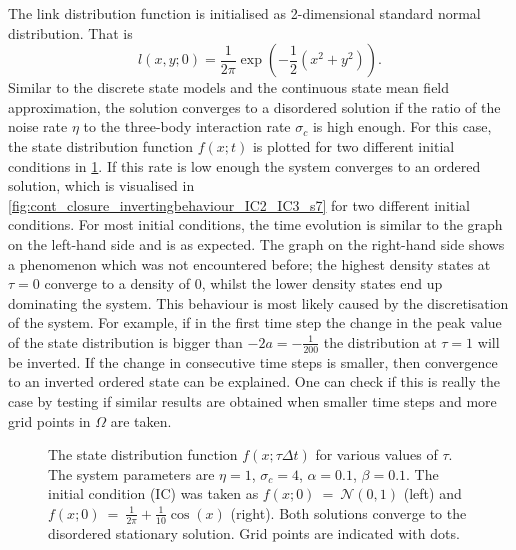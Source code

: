 The link distribution function is initialised as 2-dimensional standard normal distribution. That is 
\begin{equation}\label{eq:IC_link}
	l(x,y;0)=\frac{1}{2\pi} \exp\left(-\frac{1}{2} \left(x^2+y^2\right) \right).
\end{equation} 
Similar to the discrete state models and the continuous state mean field approximation, the solution converges to a disordered solution if the ratio of the noise rate $\eta$ to the three-body interaction rate $\sigma_c$ is high enough. For this case, the state distribution function $f(x;t)$ is plotted for two different initial conditions in \cref{fig:cont_closure_state_t_disordered_IC1_IC6_s4}. If this rate is low enough the system converges to an ordered solution, which is visualised in \cref{fig:cont_closure_invertingbehaviour_IC2_IC3_s7} for two different initial conditions. For most initial conditions, the time evolution is similar to the graph on the left-hand side and is as expected. The graph on the right-hand side shows a phenomenon which was not encountered before; the highest density states at $\tau=0$ converge to a density of 0, whilst the lower density states end up dominating the system. This behaviour is most likely caused by the discretisation of the system. For example, if in the first time step the change in the peak value of the state distribution is bigger than $-2a=-\frac{1}{200}$ the distribution at $\tau=1$ will be inverted. If the change in consecutive time steps is smaller, then convergence to an inverted ordered state can be explained. One can check if this is really the case by testing if similar results are obtained when smaller time steps and more grid points in $\Omega$ are taken. 

\begin{figure}[tbp]
	\centering
	\caption{The state distribution function $f(x;\tau \Delta t)$ for various values of $\tau$. The system parameters are $\eta=1$, $\sigma_c =4$, $\alpha=0.1$, $\beta=0.1$. The initial condition (IC) was taken as $f(x;0)~=~\mathcal{N}(0,1)$ (left) and $f(x;0)~=~\frac{1}{2\pi}+\frac{1}{10} \cos(x)$ (right). Both solutions converge to the disordered stationary solution. Grid points are indicated with dots.}
	\label{fig:cont_closure_state_t_disordered_IC1_IC6_s4}
\end{figure}

